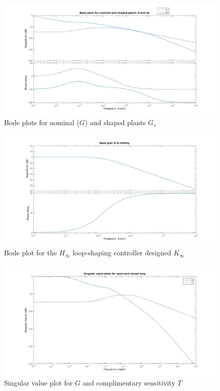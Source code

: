 \documentclass[a4paper,12pt]{article}
\begin{document}
	 	
			\begin{figure}[H]
			  \centering
			  \includegraphics[scale=0.3]{bodeGGs}
%			  
			  \caption{Bode plots for nominal ($G$) and shaped plants $G_{s}$}
	
		\end{figure}	
			\begin{figure}[H]
			  \centering
			  \includegraphics[scale=0.3]{bodeKinf}
%			  
			  \caption{Bode plot for the $H_{\infty}$ loop-shaping controller designed $K_{\infty}$}
		
		\end{figure}	
			\begin{figure}[H]
			  \centering
			  \includegraphics[scale=0.3]{singluar_values}
%			  
			  \caption{Singular value plot for $G$ and complimentary sensitivity $T$}
			
		\end{figure}	
\end{document}
